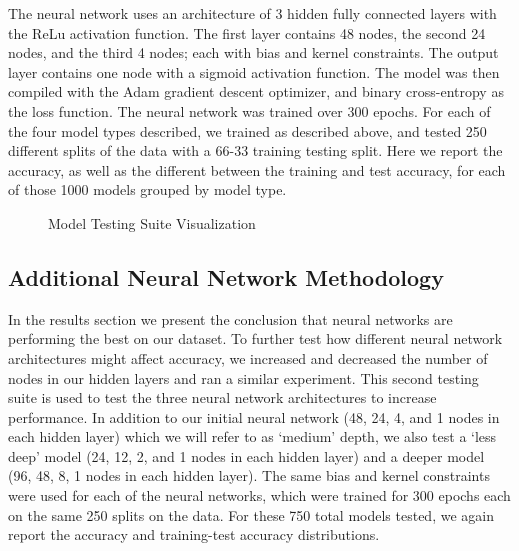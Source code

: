 \documentclass[12pt]{article}
\begin{document}
The neural network uses an architecture of 3 hidden fully connected layers with the ReLu activation function. The first layer contains 48 nodes, the second 24 nodes, and the third 4 nodes; each with bias and kernel constraints. The output layer contains one node with a sigmoid activation function. The model was then compiled with the Adam gradient descent optimizer, and binary cross-entropy as the loss function. The neural network was trained over 300 epochs. For each of the four model types described, we trained as described above, and tested 250 different splits of the data with a 66-33 training testing split. Here we report the accuracy, as well as the different between the training and test accuracy, for each of those 1000 models grouped by model type.

\begin{figure}[H]
\caption{Model Testing Suite Visualization}
\end{figure}

\subsection{Additional Neural Network Methodology}

In the results section we present the conclusion that neural networks are performing the best on our dataset. To further test how different neural network architectures might affect accuracy, we increased and decreased the number of nodes in our hidden layers and ran a similar experiment. This second testing suite is used to test the three neural network architectures to increase performance. In addition to our initial neural network (48, 24, 4, and 1 nodes in each hidden layer) which we will refer to as `medium’ depth, we also test a `less deep’ model (24, 12, 2, and 1 nodes in each hidden layer) and a deeper model (96, 48, 8, 1 nodes in each hidden layer). The same bias and kernel constraints were used for each of the neural networks, which were trained for 300 epochs each on the same 250 splits on the data. For these 750 total models tested, we again report the accuracy and training-test accuracy distributions.
\end{document}
